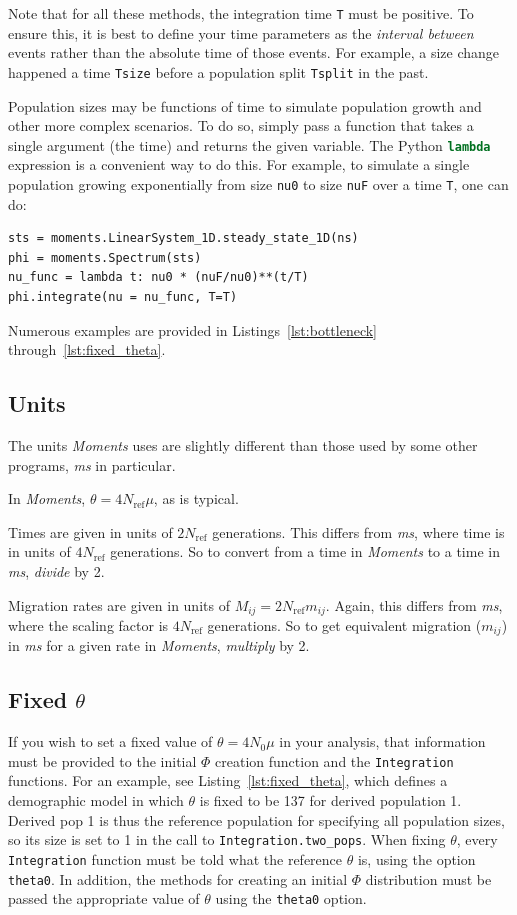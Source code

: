 \documentclass[12pt]{article}
\makeatletter
\newcommand{\Nref}{\ensuremath{N_\text{ref}}\xspace}
\newcommand{\ms}{\emph{ms}\xspace}
\newcommand{\py}[1]{\lstinline[breaklines=true,language=Python, showstringspaces=False]@#1@}
\makeatother
\begin{document}
Note that for all these methods, the integration time \py{T} must be positive.
To ensure this, it is best to define your time parameters as the \emph{interval between} events rather than the absolute time of those events.
For example, a size change happened a time \py{Tsize} before a population split \py{Tsplit} in the past.

Population sizes may be functions of time to simulate population growth and other more complex scenarios.
To do so, simply pass a function that takes a single argument (the time) and returns the given variable.
The Python \py{lambda} expression is a convenient way to do this.
For example, to simulate a single population growing exponentially from size \py{nu0} to size \py{nuF} over a time \py{T}, one can do:
\begin{lstlisting}
sts = moments.LinearSystem_1D.steady_state_1D(ns)
phi = moments.Spectrum(sts) 
nu_func = lambda t: nu0 * (nuF/nu0)**(t/T)
phi.integrate(nu = nu_func, T=T)
\end{lstlisting}

Numerous examples are provided in Listings~\ref{lst:bottleneck} through~\ref{lst:fixed_theta}.

\subsection{Units}
The units \textit{Moments} uses are slightly different than those used by some other programs, \ms in particular.

In \textit{Moments}, $\theta = 4 \Nref \mu$, as is typical.

Times are given in units of $2 \Nref$ generations.
This differs from \emph{ms}, where time is in units of $4 \Nref$ generations.
So to convert from a time in \textit{Moments} to a time in \emph{ms}, \emph{divide} by 2.

Migration rates are given in units of $M_{ij} = 2 \Nref m_{ij}$.
Again, this differs from \emph{ms}, where the scaling factor is $4 \Nref$ generations.
So to get equivalent migration ($m_{ij}$) in \ms for a given rate in \textit{Moments}, \emph{multiply} by 2.


\subsection{Fixed $\theta$}\label{sec:fixed_theta}

If you wish to set a fixed value of $\theta = 4 N_0 \mu$ in your analysis, that information must be provided to the initial $\Phi$ creation function and the \py{Integration} functions.
For an example, see Listing~\ref{lst:fixed_theta}, which defines a demographic model in which $\theta$ is fixed to be 137 for derived population 1.
Derived pop 1 is thus the reference population for specifying all population sizes, so its size is set to 1 in the call to \py{Integration.two_pops}.
When fixing $\theta$, every \py{Integration} function must be told what the reference $\theta$ is, using the option \py{theta0}.
In addition, the methods for creating an initial $\Phi$ distribution must be passed the appropriate value of $\theta$ using the \py{theta0} option.
\end{document}
